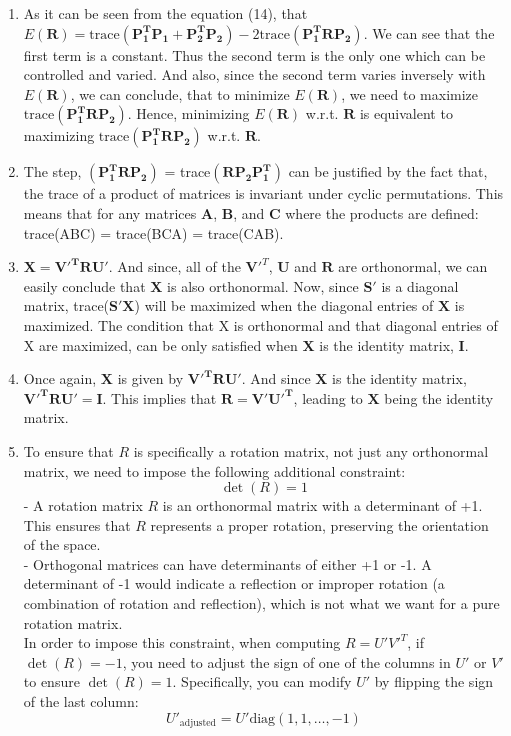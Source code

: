 \documentclass{article}
\begin{document}
\begin{enumerate}
\begin{enumerate}
    \item As it can be seen from the equation (14), that $E(\boldsymbol{R}) = \textrm{trace}(\boldsymbol{P^T_1 P_1} + \boldsymbol{P^T_2 P_2}) -2\textrm{trace}(\boldsymbol{P^T_1 R P_2})$. We can see that the first term is a constant. Thus the second term is the only one which can be controlled and varied. And also, since the second term varies inversely with $E(\boldsymbol{R})$, we can conclude, that to minimize $E(\boldsymbol{R})$, we need to maximize $\textrm{trace}(\boldsymbol{P^T_1 R P_2})$. Hence, minimizing $E(\boldsymbol{R})$ w.r.t. $\boldsymbol{R}$ is equivalent to maximizing $\textrm{trace}(\boldsymbol{P^T_1 R P_2})$ w.r.t. $\boldsymbol{R}$.

    \item The step, $(\boldsymbol{P^T_1 R P_2})$ = \textrm{trace}$(\boldsymbol{R P_2 P^T_1})$ can be justified by the fact that, the trace of a product of matrices is invariant under cyclic permutations. This means that for any matrices $\boldsymbol{A}$, $\boldsymbol{B}$, and $\boldsymbol{C}$ where the products are defined: trace(ABC) = trace(BCA) = trace(CAB).

    \item $\boldsymbol{X} = \boldsymbol{{V'}^TR U'}$. And since, all of the $\boldsymbol{V'}^T$, $\boldsymbol{U}$ and $\boldsymbol{R}$ are orthonormal, we can easily conclude that $\boldsymbol{X}$ is also orthonormal. \newline
            Now, since $\boldsymbol{S'}$ is a diagonal matrix, trace($\boldsymbol{S'}\boldsymbol{X}$) will be maximized when the diagonal entries of $\boldsymbol{X}$ is maximized. The condition that X is orthonormal and that diagonal entries of X are maximized, can be only satisfied when $\boldsymbol{X}$ is the identity matrix, $\boldsymbol{I}$.
    \item Once again, $\boldsymbol{X}$ is given by $\boldsymbol{{V'}^TR U'}$. And since $\boldsymbol{X}$ is the identity matrix, $\boldsymbol{{V'}^TR U'} = \boldsymbol{I}$. This implies that $\boldsymbol{R} = \boldsymbol{V'U'^T}$, leading to $\boldsymbol{X}$ being the identity matrix.
    \item To ensure that \( R \) is specifically a rotation matrix, not just any orthonormal matrix, we need to impose the following additional constraint:
   \[
   \det(R) = 1
   \]
- A rotation matrix \( R \) is an orthonormal matrix with a determinant of +1. This ensures that \( R \) represents a proper rotation, preserving the orientation of the space.\\
- Orthogonal matrices can have determinants of either +1 or -1. A determinant of -1 would indicate a reflection or improper rotation (a combination of rotation and reflection), which is not what we want for a pure rotation matrix.\\
In order to impose this constraint, when computing \( R = U' V'^T \), if \( \det(R) = -1 \), you need to adjust the sign of one of the columns in \( U' \) or \( V' \) to ensure \( \det(R) = 1 \). Specifically, you can modify \( U' \) by flipping the sign of the last column:
  \[
  U'_{\text{adjusted}} = U' \text{diag}(1, 1, \ldots, -1)
  \]


\end{enumerate}
\end{enumerate}
\end{document}
